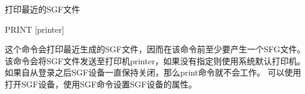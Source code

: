 \label{cmd:print}

打印最近的SGF文件

\begin{SACSTX}
PRINT [printer]
\end{SACSTX}

这个命令会打印最近生成的SGF文件，因而在该命令前至少要产生一个SFG文件。
该命令会将SGF文件发送至打印机printer，如果没有指定则使用系统默认打印机。
如果自从登录之后SGF设备一直保持关闭，那么print命令就不会工作。
可以使用  打开SGF设备，使用SGF命令设置SGF设备的属性。
